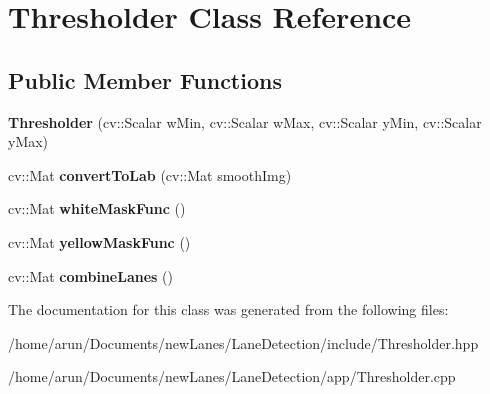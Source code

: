 \hypertarget{classThresholder}{}\section{Thresholder Class Reference}
\label{classThresholder}
\subsection*{Public Member Functions}
\begin{DoxyCompactItemize}
\item 
{\bfseries Thresholder} (cv\+::\+Scalar w\+Min, cv\+::\+Scalar w\+Max, cv\+::\+Scalar y\+Min, cv\+::\+Scalar y\+Max)\hypertarget{classThresholder_a203d11cdf12a39b998594bf091c95ebf}{}\label{classThresholder_a203d11cdf12a39b998594bf091c95ebf}

\item 
cv\+::\+Mat {\bfseries convert\+To\+Lab} (cv\+::\+Mat smooth\+Img)\hypertarget{classThresholder_a3b22a764fba3adedeb1682386555a93e}{}\label{classThresholder_a3b22a764fba3adedeb1682386555a93e}

\item 
cv\+::\+Mat {\bfseries white\+Mask\+Func} ()\hypertarget{classThresholder_a26d623fe0ebaabf5d1cf26e97499884e}{}\label{classThresholder_a26d623fe0ebaabf5d1cf26e97499884e}

\item 
cv\+::\+Mat {\bfseries yellow\+Mask\+Func} ()\hypertarget{classThresholder_af94fe2b05eec38afe5b52a8edfb25e8c}{}\label{classThresholder_af94fe2b05eec38afe5b52a8edfb25e8c}

\item 
cv\+::\+Mat {\bfseries combine\+Lanes} ()\hypertarget{classThresholder_a26948eeee8cbe6c39fd6a5415dae8fa6}{}\label{classThresholder_a26948eeee8cbe6c39fd6a5415dae8fa6}

\end{DoxyCompactItemize}


The documentation for this class was generated from the following files\+:\begin{DoxyCompactItemize}
\item 
/home/arun/\+Documents/new\+Lanes/\+Lane\+Detection/include/Thresholder.\+hpp\item 
/home/arun/\+Documents/new\+Lanes/\+Lane\+Detection/app/Thresholder.\+cpp\end{DoxyCompactItemize}

